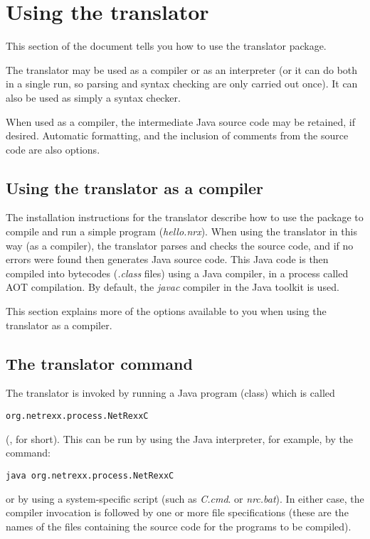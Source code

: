 

\chapter{Using the translator}
This section of the document tells you how to use the
translator package.

The \nr{} translator may be used as a compiler or as an interpreter
(or it can do both in a single run, so parsing and syntax checking are
only carried out once).  It can also be used as simply a syntax checker.

When used as a compiler, the intermediate Java source code may be
retained, if desired.  Automatic formatting, and the inclusion of comments
from the \nr{} source code are also options.

\section{Using the translator as a compiler}
The installation instructions for the \nr{} translator describe how to
use the package to compile and run a simple \nr{} program
(\emph{hello.nrx}).  When using the translator in this way (as a
compiler), the translator parses and checks the \nr{} source code, and
if no errors were found then generates Java source code.  This Java
code is then compiled into bytecodes
(\emph{.class} files) using a Java compiler, in a process called AOT
compilation. By default,
the \emph{javac} compiler in the Java toolkit is used.

This section explains more of the options available to you when using
the translator as a compiler.
\section{The translator command}

The translator is invoked by running a Java program (class) which is
called 
\begin{verbatim}
org.netrexx.process.NetRexxC
\end{verbatim}  
(, for short). This can be run by using the Java interpreter, for example,
by the command:
\begin{verbatim}
java org.netrexx.process.NetRexxC
\end{verbatim}
or by using a system-specific script (such as \emph{\nr{}C.cmd}.
or \emph{nrc.bat}).  In either case, the compiler invocation is followed
by one or more file specifications (these are the names of the files
containing the \nr{} source code for the programs to be compiled).


